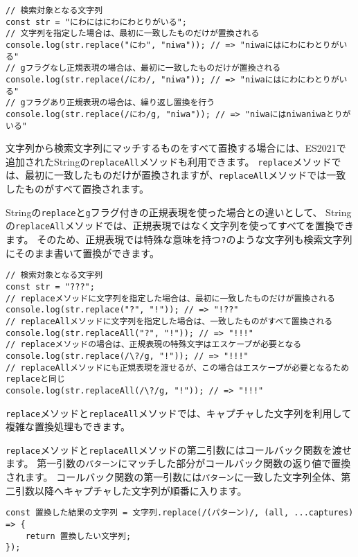 \begin{lstlisting}
// 検索対象となる文字列
const str = "にわにはにわにわとりがいる";
// 文字列を指定した場合は、最初に一致したものだけが置換される
console.log(str.replace("にわ", "niwa")); // => "niwaにはにわにわとりがいる"
// gフラグなし正規表現の場合は、最初に一致したものだけが置換される
console.log(str.replace(/にわ/, "niwa")); // => "niwaにはにわにわとりがいる"
// gフラグあり正規表現の場合は、繰り返し置換を行う
console.log(str.replace(/にわ/g, "niwa")); // => "niwaにはniwaniwaとりがいる"
\end{lstlisting}

文字列から検索文字列にマッチするものをすべて置換する場合には、ES2021で追加されたStringの\texttt{replaceAll}メソッドも利用できます。
\texttt{replace}メソッドでは、最初に一致したものだけが置換されますが、\texttt{replaceAll}メソッドでは一致したものがすべて置換されます。

Stringの\texttt{replace}と\texttt{g}フラグ付きの正規表現を使った場合との違いとして、
Stringの\texttt{replaceAll}メソッドでは、正規表現ではなく文字列を使ってすべてを置換できます。
そのため、正規表現では特殊な意味を持つ\texttt{?}のような文字列も検索文字列にそのまま書いて置換ができます。

\begin{lstlisting}
// 検索対象となる文字列
const str = "???";
// replaceメソッドに文字列を指定した場合は、最初に一致したものだけが置換される
console.log(str.replace("?", "!")); // => "!??"
// replaceAllメソッドに文字列を指定した場合は、一致したものがすべて置換される
console.log(str.replaceAll("?", "!")); // => "!!!"
// replaceメソッドの場合は、正規表現の特殊文字はエスケープが必要となる
console.log(str.replace(/\?/g, "!")); // => "!!!"
// replaceAllメソッドにも正規表現を渡せるが、この場合はエスケープが必要となるためreplaceと同じ
console.log(str.replaceAll(/\?/g, "!")); // => "!!!"
\end{lstlisting}

\texttt{replace}メソッドと\texttt{replaceAll}メソッドでは、キャプチャした文字列を利用して複雑な置換処理もできます。

\texttt{replace}メソッドと\texttt{replaceAll}メソッドの第二引数にはコールバック関数を渡せます。
第一引数の\texttt{パターン}にマッチした部分がコールバック関数の返り値で置換されます。
コールバック関数の第一引数には\texttt{パターン}に一致した文字列全体、第二引数以降へキャプチャした文字列が順番に入ります。

\begin{lstlisting}
const 置換した結果の文字列 = 文字列.replace(/(パターン)/, (all, ...captures) => {
    return 置換したい文字列;
});
\end{lstlisting}

